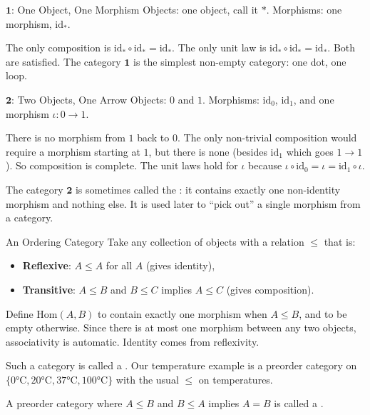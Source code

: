 \begin{example}{$\mathbf{1}$: One Object, One Morphism}
Objects: one object, call it $*$. Morphisms: one morphism, $\mathrm{id}_*$.

The only composition is $\mathrm{id}_* \circ \mathrm{id}_* = \mathrm{id}_*$.
The only unit law is $\mathrm{id}_* \circ \mathrm{id}_* = \mathrm{id}_*$.
Both are satisfied. The category $\mathbf{1}$ is the simplest non-empty
category: one dot, one loop.
\end{example}

\begin{example}{$\mathbf{2}$: Two Objects, One Arrow}
Objects: $0$ and $1$. Morphisms: $\mathrm{id}_0$, $\mathrm{id}_1$, and one
morphism $\iota : 0 \to 1$.

\medskip
\begin{center}
\end{center}
\medskip

There is no morphism from $1$ back to $0$. The only non-trivial
composition would require a morphism starting at $1$, but there is none
(besides $\mathrm{id}_1$ which goes $1 \to 1$). So composition is
complete. The unit laws hold for $\iota$ because
$\iota \circ \mathrm{id}_0 = \iota = \mathrm{id}_1 \circ \iota$.

The category $\mathbf{2}$ is sometimes called the :
it contains exactly one non-identity morphism and nothing else. It is used
later to ``pick out'' a single morphism from a category.
\end{example}

\begin{example}{An Ordering Category}
Take any collection of objects with a relation $\leq$ that is:
\begin{itemize}
  \item \textbf{Reflexive}: $A \leq A$ for all $A$ (gives identity),
  \item \textbf{Transitive}: $A \leq B$ and $B \leq C$ implies $A \leq C$
        (gives composition).
\end{itemize}

Define $\mathrm{Hom}(A, B)$ to contain exactly one morphism when $A \leq B$,
and to be empty otherwise. Since there is at most one morphism between any
two objects, associativity is automatic. Identity comes from reflexivity.

Such a category is called a . Our temperature
example is a preorder category on $\{0°\text{C}, 20°\text{C}, 37°\text{C},
100°\text{C}\}$ with the usual $\leq$ on temperatures.

A preorder category where $A \leq B$ and $B \leq A$ implies $A = B$ is
called a .
\end{example}

